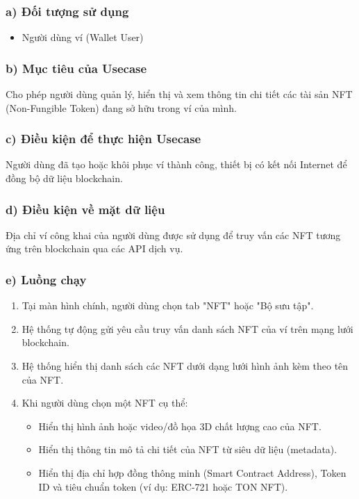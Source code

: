 \documentclass[a4paper]{report}
\begin{document}
\subsubsection{a) Đối tượng sử dụng}
\begin{itemize}
    \item Người dùng ví (Wallet User)
\end{itemize}

\subsubsection{b) Mục tiêu của Usecase}
Cho phép người dùng quản lý, hiển thị và xem thông tin chi tiết các tài sản NFT (Non-Fungible Token) đang sở hữu trong ví của mình.

\subsubsection{c) Điều kiện để thực hiện Usecase}
Người dùng đã tạo hoặc khôi phục ví thành công, thiết bị có kết nối Internet để đồng bộ dữ liệu blockchain.

\subsubsection{d) Điều kiện về mặt dữ liệu}
Địa chỉ ví công khai của người dùng được sử dụng để truy vấn các NFT tương ứng trên blockchain qua các API dịch vụ.

\subsubsection{e) Luồng chạy}
\begin{enumerate}
    \item Tại màn hình chính, người dùng chọn tab "NFT" hoặc "Bộ sưu tập".
    \item Hệ thống tự động gửi yêu cầu truy vấn danh sách NFT của ví trên mạng lưới blockchain.
    \item Hệ thống hiển thị danh sách các NFT dưới dạng lưới hình ảnh kèm theo tên của NFT.
    \item Khi người dùng chọn một NFT cụ thể:
    \begin{itemize}
        \item Hiển thị hình ảnh hoặc video/đồ họa 3D chất lượng cao của NFT.
        \item Hiển thị thông tin mô tả chi tiết của NFT từ siêu dữ liệu (metadata).
        \item Hiển thị địa chỉ hợp đồng thông minh (Smart Contract Address), Token ID và tiêu chuẩn token (ví dụ: ERC-721 hoặc TON NFT).
    \end{itemize}
\end{enumerate}
\end{document}
